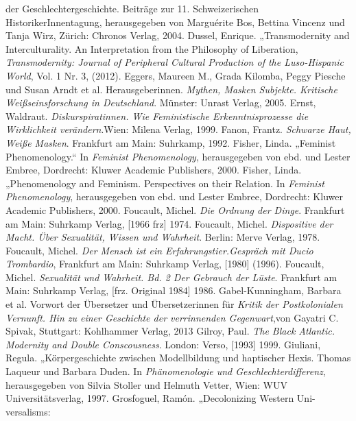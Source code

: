 \documentclass[11pt]{article}
\begin{document}
\begin{thebibliography}{100}
{  der Geschlechtergeschichte. Beiträge zur 11. Schweizerischen
HistorikerInnentagung}, herausgegeben von Marguérite Bos, Bettina Vincenz und Tanja Wirz,  Zürich: Chronos Verlag, 2004.
 Dussel, Enrique. „Transmodernity and Interculturality. An Interpretation from the Philosophy of
Liberation, \emph{Transmodernity: Journal of Peripheral Cultural Production
of the Luso-Hispanic World}, Vol. 1 Nr. 3, (2012).
 Eggers, Maureen M., Grada Kilomba, Peggy Piesche und Susan
Arndt  et al. Herausgeberinnen. \emph{Mythen, Masken Subjekte. Kritische
Weißseinsforschung in Deutschland}. Münster: Unrast Verlag, 2005.
 Ernst, Waldraut. \emph{Diskurspiratinnen. Wie Feministische
  Erkenntnisprozesse die Wirklichkeit verändern}.Wien: Milena Verlag, 1999.
   Fanon, Frantz. \emph{Schwarze Haut, Weiße Masken}. Frankfurt am Main: Suhrkamp, 1992. 
   Fisher, Linda. „Feminist Phenomenology.“ In \emph{Feminist   Phenomenology}, herausgegeben von ebd. und Lester Embree, Dordrecht: Kluwer Academic Publishers, 2000.
   Fisher, Linda. „Phenomenology and Feminism. Perspectives
  on their Relation. In \emph{Feminist Phenomenology}, herausgegeben von ebd. und Lester Embree,  Dordrecht: Kluwer Academic Publishers, 2000. 
   Foucault, Michel. \emph{Die Ordnung der Dinge}. Frankfurt am Main: Suhrkamp Verlag, [1966 frz] 1974.
   Foucault, Michel. \emph{Dispositive der Macht. Über
  Sexualität, Wissen und Wahrheit}. Berlin: Merve Verlag, 1978.
   Foucault, Michel. \emph{Der Mensch ist ein
  Erfahrungstier.Gespräch mit Ducio Trombardio}, Frankfurt am Main: Suhrkamp Verlag, [1980] (1996).
   Foucault, Michel. \emph{Sexualität und Wahrheit. Bd. 2
  Der Gebrauch der Lüste}.  Frankfurt am Main: Suhrkamp Verlag, [frz. Original 1984] 1986.
   Gabel-Kunningham, Barbara et al. Vorwort der Übersetzer
  und Übersetzerinnen für \emph{Kritik der Postkolonialen Vernunft. Hin zu
  einer Geschichte der verrinnenden Gegenwart},von Gayatri C. Spivak, Stuttgart: Kohlhammer Verlag, 2013
   Gilroy, Paul. \emph{The Black Atlantic. Modernity and Double Conscousness}. London: Verso, [1993] 1999.
   Giuliani, Regula. „Körpergeschichte zwischen Modellbildung und haptischer Hexis. Thomas
  Laqueur und Barbara Duden. In \emph{Phänomenologie und Geschlechterdifferenz}, herausgegeben von Silvia Stoller und Helmuth Vetter, Wien: WUV Universitätsverlag, 1997.
   Grosfoguel, Ramón. „Decolonizing Western Uni-versalisms:

\end{thebibliography}
\end{document}
